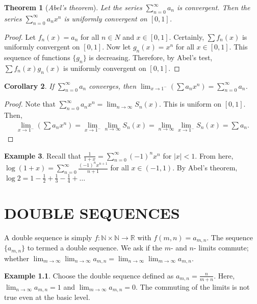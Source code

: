 \documentclass[15pt,a4paper]{book}
\newtheorem{theorem}{Theorem}[chapter]
\newtheorem{corollary}[theorem]{Corollary}
\theoremstyle{definition}
\newtheorem{example}[theorem]{Example}
\newcommand{\eax}[1]{\emph{#1}\index{#1}} %
\newcommand{\abs}[1]{\left| #1 \right|} %
\newcommand{\N}{\mathbb{N}} %
\newcommand{\R}{\mathbb{R}} %
\begin{document}
\begin{theorem}[\eax{Abel's theorem}]
    Let the series $\sum_{n=0}^{\infty} a_{n}$ is convergent. Then the series $\sum_{n=0}^{\infty} a_{n}x^{n}$ is uniformly convergent on $[0,1]$.
\end{theorem}
\begin{proof}
    Let $f_{n}(x) = a_{n}$ for all $n \in N$ and $x \in [0,1]$. Certainly, $\sum f_{n}(x)$ is uniformly convergent on $[0,1]$. Now let $g_{n}(x) = x^{n}$ for all $x \in [0,1]$. This sequence of functions $\{g_{n}\}$ is decreasing. Therefore, by Abel's test, $\sum f_{n}(x) g_{n}(x)$ is uniformly convergent on $[0,1]$.
\end{proof}

\begin{corollary}
    If $\sum_{n=0}^{\infty} a_{n}$ converges, then $\lim_{x \to 1^{-}}(\sum a_{n}x^{n}) = \sum_{n=0}^{\infty} a_{n}$.
\end{corollary}
\begin{proof}
    Note that $\sum_{n=0}^{\infty} a_{n}x^{n} = \lim_{n \to \infty} S_{n}(x)$. This is uniform on $[0,1]$. Then,
    \begin{align}
        \lim_{x \to 1^{-}} (\sum a_{n}x^{n}) = \lim_{x \to 1^{-}} \lim_{n \to \infty} S_{n}(x) = \lim_{n \to \infty} \lim_{x \to 1^{-}} S_{n}(x) = \sum a_{n}.
    \end{align}
\end{proof}

\begin{example}
    Recall that $\frac{1}{1+x} = \sum_{n=0}^{\infty} (-1)^{n} x^{n}$ for $\abs{x} < 1$. From here, $\log (1+x) = \sum_{n=0}^{\infty} \frac{(-1)^{n}x^{n+1}}{n+1}$ for all $x \in (-1,1)$. By Abel's theorem, $\log 2 = 1 - \frac{1}{2} + \frac{1}{3} - \frac{1}{4} + \ldots$
\end{example}

\chapter{DOUBLE SEQUENCES}
A double sequence is simply $f:\N \times \N \to \R$ with $f(m,n) = a_{m,n}$. The sequence $\{a_{m,n}\}$ to termed a double sequence. We ask if the $m$- and $n$- limits commute; whether $\lim_{m \to \infty} \lim_{n \to \infty} a_{m,n} = \lim_{n \to \infty} \lim_{m \to \infty} a_{m,n}$.

\begin{example}
    Choose the double sequence defined as $a_{m,n} = \frac{n}{m+n}$. Here, $\lim_{n \to \infty} a_{m,n} = 1$ and $\lim_{m \to \infty} a_{m,n} = 0$. The commuting of the limits is not true even at the basic level.
\end{example}
\end{document}
